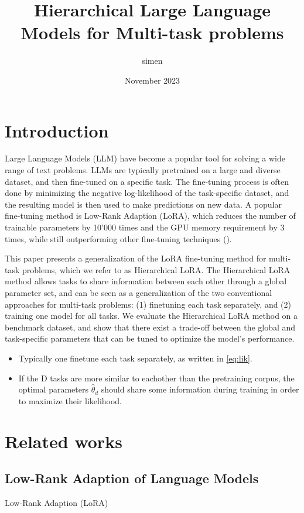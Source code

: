 \documentclass{article}
\title{Hierarchical Large Language Models for Multi-task problems}
\author{simen }
\date{November 2023}
\begin{document}
\maketitle

\section{Introduction}
Large Language Models (LLM) have become a popular tool for solving a wide range of text problems. LLMs are typically pretrained on a large and diverse dataset, and then fine-tuned on a specific task. The fine-tuning process is often done by minimizing the negative log-likelihood of the task-specific dataset, and the resulting model is then used to make predictions on new data. A popular fine-tuning method is Low-Rank Adaption (LoRA), which reduces the number of trainable parameters by 10'000 times and the GPU memory requirement by 3 times, while still outperforming other fine-tuning techniques (\cite{hu_lora_2021}).

This paper presents a generalization of the LoRA fine-tuning method for multi-task problems, which we refer to as Hierarchical LoRA. The Hierarchical LoRA method allows tasks to share information between each other through a global parameter set, and can be seen as a generalization of the two conventional approaches for multi-task problems: (1) finetuning each task separately, and (2) training one model for all tasks. We evaluate the Hierarchical LoRA method on a benchmark dataset, and show that there exist a trade-off between the global and task-specific parameters that can be tuned to optimize the model's performance.

\begin{itemize}
    \item Typically one finetune each task separately, as written in \ref{eq:lik}.
    \item If the D tasks are more similar to eachother than the pretraining corpus, the optimal parameters $\hat{\theta}_d$ should share some information during training in order to maximize their likelihood.
\end{itemize}

\section{Related works}

\subsection{Low-Rank Adaption of Language Models}
Low-Rank Adaption (LoRA)
\end{document}
